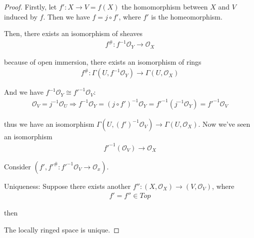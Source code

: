 \documentclass[Total.tex]{subfiles}
\begin{document}
				\begin{proof}
					Firstly, let $f':X\rightarrow V=f(X)$ the homomorphism between $X$ and $V$ induced by $f$. Then we have $f=j\circ f'$, where $f'$ is the homeomorphism. 
					
					Then, there exists an isomorphism of sheaves
					\begin{gather*}
						f^\#:f^{-1}\mathcal{O}_Y\rightarrow \mathcal{O}_X
					\end{gather*}
					
					because of open immersion, there exists an isomorphism of rings
					\begin{gather*}
						f^\#:\Gamma(U,f^{-1}\mathcal{O}_Y)\rightarrow \Gamma(U,\mathcal{O}_X)
					\end{gather*}
					
					And we have $f^{-1}\mathcal{O}_Y\cong f'^{-1}\mathcal{O}_V$:
					\begin{gather*}
						\mathcal{O}_V=j^{-1}\mathcal{O}_U\Rightarrow f^{-1}\mathcal{O}_Y=(j\circ f')^{-1}\mathcal{O}_Y=f'^{-1}(j^{-1}\mathcal{O}_Y)=f'^{-1}\mathcal{O}_V
					\end{gather*}
					
					thus we have an isomorphism $\Gamma(U,(f')^{-1}\mathcal{O}_V)\rightarrow \Gamma(U,\mathcal{O}_X)$. Now we've seen an isomorphism
					\begin{gather*}
						f'^{-1}(\mathcal{O}_V)\rightarrow \mathcal{O}_X
					\end{gather*}
					
					Consider $(f',f'^\#:f'^{-1}\mathcal{O}_V\rightarrow \mathcal{O}_x)$. 
					
					Uniqueness: Suppose there exists another $f'':(X,\mathcal{O}_X)\rightarrow (V,\mathcal{O}_V)$, where
					\begin{gather*}
						f'=f''\in Top
					\end{gather*}
					
					 then 
					\begin{center}
					\end{center}
					
					The locally ringed space is unique.
					\end{proof}
					
\end{document}

